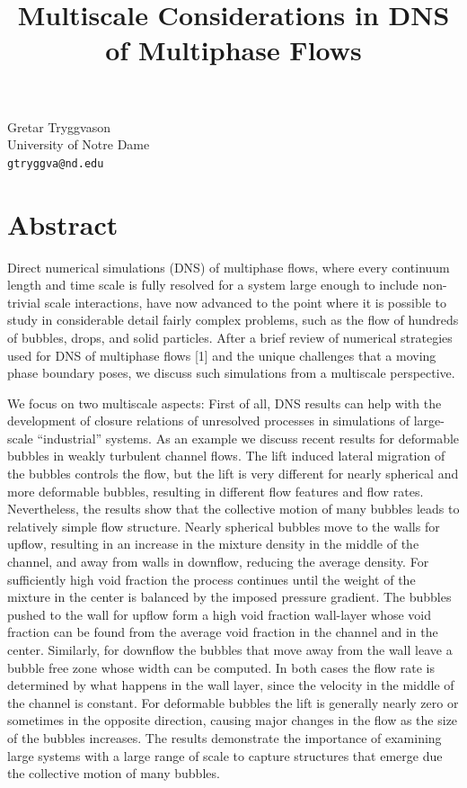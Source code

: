 \documentclass[article,A4,11pt]{llncs}%
\begin{document}
\title{Multiscale Considerations in DNS of Multiphase Flows}
 \author{} \institute{}
\maketitle
\begin{center}
{\large Gretar Tryggvason}\\
University of Notre Dame\\
{\tt gtryggva@nd.edu}
\end{center}

\section*{Abstract}
Direct numerical simulations (DNS) of multiphase flows, where every continuum length and time scale is fully resolved for a system large enough to include non-trivial scale interactions, have now advanced to the point where it is possible to study in considerable detail fairly complex problems, such as the flow of hundreds of bubbles, drops, and solid particles. After a brief review of numerical strategies used for DNS of multiphase flows [1] and the unique challenges that a moving phase boundary poses, we discuss such simulations from a multiscale perspective.

We focus on two multiscale aspects: First of all, DNS results can help with the development of closure relations of unresolved processes in simulations of large-scale ``industrial'' systems. As an example we discuss recent results for deformable bubbles in weakly turbulent channel flows. The lift induced lateral migration of the bubbles controls the flow, but the lift is very different for nearly spherical and more deformable bubbles, resulting in different flow features and flow rates. Nevertheless, the results show that the collective motion of many bubbles leads to relatively simple flow structure. Nearly spherical bubbles move to the walls for upflow, resulting in an increase in the mixture density in the middle of the channel, and away from walls in downflow, reducing the average density. For sufficiently high void fraction the process continues until the weight of the mixture in the center is balanced by the imposed pressure gradient. The bubbles pushed to the wall for upflow form a high void fraction wall-layer whose void fraction can be found from the average void fraction in the channel and in the center. Similarly, for downflow the bubbles that move away from the wall leave a bubble free zone whose width can be computed. In both cases the flow rate is determined by what happens in the wall layer, since the velocity in the middle of the channel is constant. For deformable bubbles the lift is generally nearly zero or sometimes in the opposite direction, causing major changes in the flow as the size of the bubbles increases. The results demonstrate the importance of examining large systems with a large range of scale to capture structures that emerge due the collective motion of many bubbles.
\end{document}
